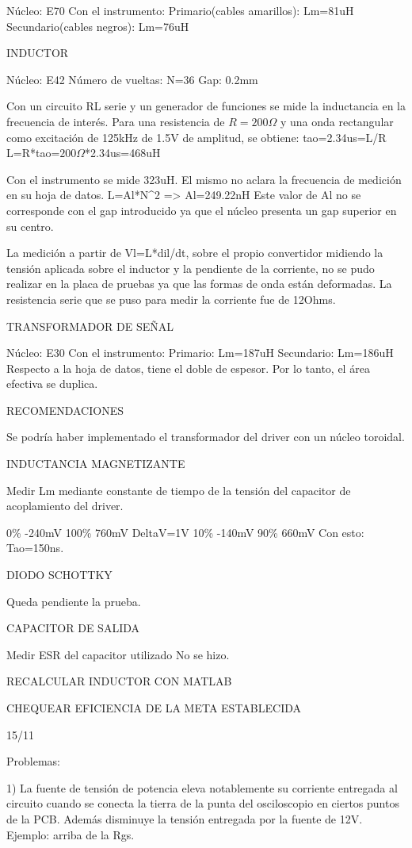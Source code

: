 Núcleo: E70
Con el instrumento:
Primario(cables amarillos): Lm=81uH
Secundario(cables negros): Lm=76uH

INDUCTOR

Núcleo: E42
Número de vueltas: N=36
Gap: 0.2mm

Con un circuito RL serie y un generador de funciones se mide la inductancia en la frecuencia de interés.
Para una resistencia de $R=200\Omega$ y una onda rectangular como excitación de 125kHz de 1.5V de amplitud, se obtiene:
tao=2.34us=L/R
L=R*tao=$200\Omega$*2.34us=468uH

Con el instrumento se mide 323uH. El mismo no aclara la frecuencia de medición en su hoja de datos. 
L=Al*N^2 => Al=249.22nH
Este valor de Al no se corresponde con el gap introducido ya que el núcleo presenta un gap superior en su centro. 

La medición a partir de Vl=L*dil/dt, sobre el propio convertidor midiendo la tensión aplicada sobre el inductor y la pendiente de la corriente, 
no se pudo realizar en la placa de pruebas ya que las formas de onda están deformadas. 
La resistencia serie que se puso para medir la corriente fue de 12Ohms. 

TRANSFORMADOR DE SEÑAL 

Núcleo: E30
Con el instrumento:
Primario: Lm=187uH
Secundario: Lm=186uH
Respecto a la hoja de datos, tiene el doble de espesor. 
Por lo tanto, el área efectiva se duplica. 

RECOMENDACIONES

Se podría haber implementado el transformador del driver con un núcleo toroidal. 

INDUCTANCIA MAGNETIZANTE

Medir Lm mediante constante de tiempo de la tensión del capacitor de acoplamiento del driver.

0\% -240mV
100\% 760mV
DeltaV=1V
10\% -140mV
90\% 660mV
Con esto:
Tao=150ns. 

DIODO SCHOTTKY

Queda pendiente la prueba. 

CAPACITOR DE SALIDA 

Medir ESR del capacitor utilizado
No se hizo. 

RECALCULAR INDUCTOR CON MATLAB

CHEQUEAR EFICIENCIA DE LA META ESTABLECIDA 

15/11

Problemas:

1) La fuente de tensión de potencia eleva notablemente su corriente entregada al circuito 
cuando se conecta la tierra de la punta del osciloscopio en ciertos puntos de la PCB. 
Además disminuye la tensión entregada por la fuente de 12V. 
Ejemplo: arriba de la Rgs.

